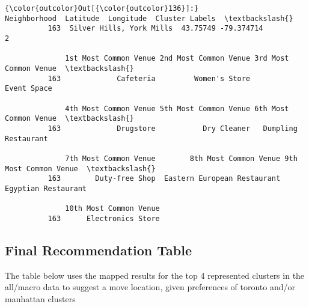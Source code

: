 \documentclass[11pt]{article}
\begin{document}
\begin{Verbatim}[commandchars=\\\{\}]
{\color{outcolor}Out[{\color{outcolor}136}]:}                  Neighborhood  Latitude  Longitude  Cluster Labels  \textbackslash{}
          163  Silver Hills, York Mills  43.75749 -79.374714               2   
          
              1st Most Common Venue 2nd Most Common Venue 3rd Most Common Venue  \textbackslash{}
          163             Cafeteria         Women's Store           Event Space   
          
              4th Most Common Venue 5th Most Common Venue 6th Most Common Venue  \textbackslash{}
          163             Drugstore           Dry Cleaner   Dumpling Restaurant   
          
              7th Most Common Venue        8th Most Common Venue 9th Most Common Venue  \textbackslash{}
          163        Duty-free Shop  Eastern European Restaurant   Egyptian Restaurant   
          
              10th Most Common Venue  
          163      Electronics Store  
\end{Verbatim}
            
    \subsection{Final Recommendation
Table}\label{final-recommendation-table}

The table below uses the mapped results for the top 4 represented
clusters in the all/macro data to suggest a move location, given
preferences of toronto and/or manhattan clusters
\end{document}
